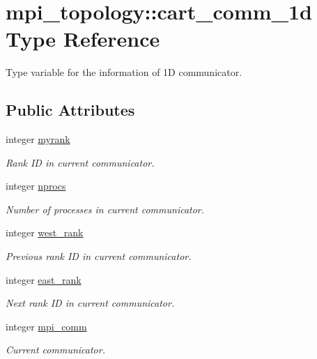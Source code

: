 \hypertarget{structmpi__topology_1_1cart__comm__1d}{}\section{mpi\+\_\+topology\+:\+:cart\+\_\+comm\+\_\+1d Type Reference}
\label{structmpi__topology_1_1cart__comm__1d}


Type variable for the information of 1D communicator.  


\subsection*{Public Attributes}
\begin{DoxyCompactItemize}
\item 
integer \hyperlink{structmpi__topology_1_1cart__comm__1d_a0b76696fcf5c27f5cfdc48e53a2671ef}{myrank}
\begin{DoxyCompactList}\small\item\em Rank ID in current communicator. \end{DoxyCompactList}\item 
integer \hyperlink{structmpi__topology_1_1cart__comm__1d_adf78d1be6ca59cada6cc444edde4c3fc}{nprocs}
\begin{DoxyCompactList}\small\item\em Number of processes in current communicator. \end{DoxyCompactList}\item 
integer \hyperlink{structmpi__topology_1_1cart__comm__1d_a63baa1f74126ffda0b67af1c487dcd45}{west\+\_\+rank}
\begin{DoxyCompactList}\small\item\em Previous rank ID in current communicator. \end{DoxyCompactList}\item 
integer \hyperlink{structmpi__topology_1_1cart__comm__1d_a550b10f02ed0c5a8469174df8b54f525}{east\+\_\+rank}
\begin{DoxyCompactList}\small\item\em Next rank ID in current communicator. \end{DoxyCompactList}\item 
integer \hyperlink{structmpi__topology_1_1cart__comm__1d_ab9d9b0c2f72db4fb74c0264691778a45}{mpi\+\_\+comm}
\begin{DoxyCompactList}\small\item\em Current communicator. \end{DoxyCompactList}\end{DoxyCompactItemize}



